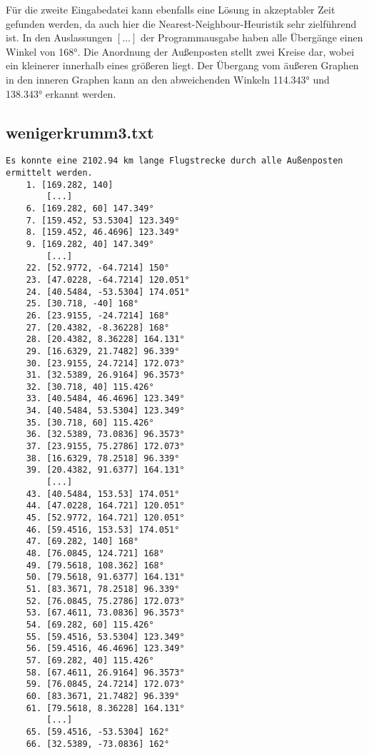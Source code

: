 \documentclass[a4paper,10pt,ngerman]{scrartcl}
\begin{document}
    Für die zweite Eingabedatei kann ebenfalls eine Lösung in akzeptabler Zeit gefunden werden,
    da auch hier die Nearest-Neighbour-Heuristik sehr zielführend ist.
    In den Auslassungen $[\dots]$ der Programmausgabe haben alle Übergänge einen Winkel von 168°.
    Die Anordnung der Außenposten stellt zwei Kreise dar, wobei ein kleinerer innerhalb eines größeren liegt.
    Der Übergang vom äußeren Graphen in den inneren Graphen kann an den abweichenden Winkeln 114.343° und 138.343° erkannt werden.

    \subsection{wenigerkrumm3.txt}\label{subsec:wenigerkrumm3.txt}

    \begin{lstlisting}[frame=single, title=Programmausgabe wenigerkrumm3.txt, breaklines=true,label={lst:lstlisting4}]
    Es konnte eine 2102.94 km lange Flugstrecke durch alle Außenposten ermittelt werden.
    1. [169.282, 140]
        [...]
    6. [169.282, 60] 147.349°
    7. [159.452, 53.5304] 123.349°
    8. [159.452, 46.4696] 123.349°
    9. [169.282, 40] 147.349°
        [...]
    22. [52.9772, -64.7214] 150°
    23. [47.0228, -64.7214] 120.051°
    24. [40.5484, -53.5304] 174.051°
    25. [30.718, -40] 168°
    26. [23.9155, -24.7214] 168°
    27. [20.4382, -8.36228] 168°
    28. [20.4382, 8.36228] 164.131°
    29. [16.6329, 21.7482] 96.339°
    30. [23.9155, 24.7214] 172.073°
    31. [32.5389, 26.9164] 96.3573°
    32. [30.718, 40] 115.426°
    33. [40.5484, 46.4696] 123.349°
    34. [40.5484, 53.5304] 123.349°
    35. [30.718, 60] 115.426°
    36. [32.5389, 73.0836] 96.3573°
    37. [23.9155, 75.2786] 172.073°
    38. [16.6329, 78.2518] 96.339°
    39. [20.4382, 91.6377] 164.131°
        [...]
    43. [40.5484, 153.53] 174.051°
    44. [47.0228, 164.721] 120.051°
    45. [52.9772, 164.721] 120.051°
    46. [59.4516, 153.53] 174.051°
    47. [69.282, 140] 168°
    48. [76.0845, 124.721] 168°
    49. [79.5618, 108.362] 168°
    50. [79.5618, 91.6377] 164.131°
    51. [83.3671, 78.2518] 96.339°
    52. [76.0845, 75.2786] 172.073°
    53. [67.4611, 73.0836] 96.3573°
    54. [69.282, 60] 115.426°
    55. [59.4516, 53.5304] 123.349°
    56. [59.4516, 46.4696] 123.349°
    57. [69.282, 40] 115.426°
    58. [67.4611, 26.9164] 96.3573°
    59. [76.0845, 24.7214] 172.073°
    60. [83.3671, 21.7482] 96.339°
    61. [79.5618, 8.36228] 164.131°
        [...]
    65. [59.4516, -53.5304] 162°
    66. [32.5389, -73.0836] 162°

\end{lstlisting}
\end{document}
